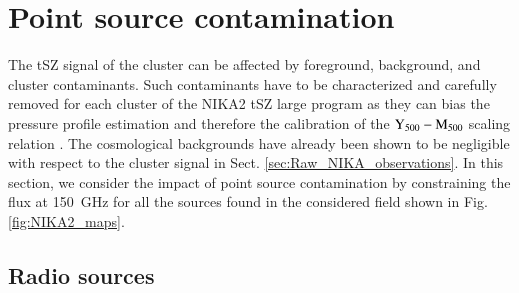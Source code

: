 \documentclass[traditabstract]{aa}
\begin{document}

\section{Point source contamination}\label{sec:point_source}

The tSZ signal of the cluster can be affected by foreground, background, and cluster contaminants. Such contaminants have to be characterized and carefully removed for each cluster of the NIKA2 tSZ large program as they can bias the pressure profile estimation and therefore the calibration of the $\rm{Y_{500}}-\rm{M_{500}}$ scaling relation \citep[see \emph{e.g.}][]{ada16a}. The cosmological backgrounds have already been shown to be negligible with respect to the cluster signal in Sect. \ref{sec:Raw_NIKA_observations}. In this section, we consider the impact of point source contamination by constraining the flux at 150~GHz for all the sources found in the considered field shown in Fig. \ref{fig:NIKA2_maps}.

\subsection{Radio sources}\label{sec:radio}
\end{document}
